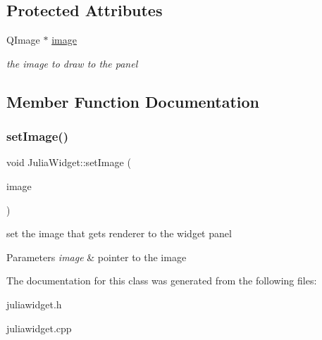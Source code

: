 \subsection*{Protected Attributes}
\begin{DoxyCompactItemize}
\item 
\mbox{\label{classJuliaWidget_abc96ffcb51d90cc16ed92242fdb62d1b}} 
Q\+Image $\ast$ \hyperlink{classJuliaWidget_abc96ffcb51d90cc16ed92242fdb62d1b}{image}
\begin{DoxyCompactList}\small\item\em the image to draw to the panel \end{DoxyCompactList}\end{DoxyCompactItemize}


\subsection{Member Function Documentation}
\mbox{\label{classJuliaWidget_a686d58acadb8eaa396ca6904318a5547}} 
\subsubsection{\texorpdfstring{set\+Image()}{setImage()}}
{\footnotesize\ttfamily void Julia\+Widget\+::set\+Image (\begin{DoxyParamCaption}\item[{Q\+Image $\ast$}]{image }\end{DoxyParamCaption})}

set the image that gets renderer to the widget panel 
\begin{DoxyParams}{Parameters}
{\em image} & pointer to the image \\
\hline
\end{DoxyParams}


The documentation for this class was generated from the following files\+:\begin{DoxyCompactItemize}
\item 
juliawidget.\+h\item 
juliawidget.\+cpp\end{DoxyCompactItemize}
